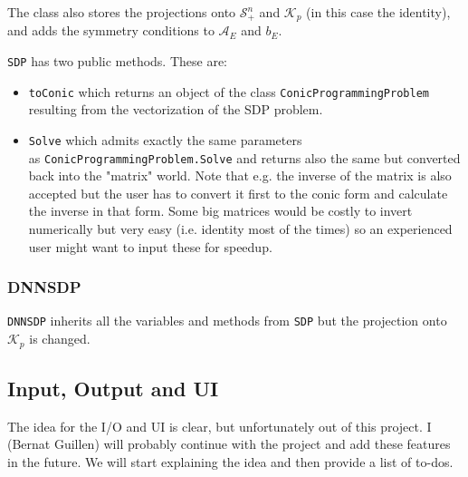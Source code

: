 \documentclass[paper=a4, fontsize=11pt]{scrartcl}
\numberwithin{equation}{section}		%
\numberwithin{figure}{section}			%
\numberwithin{table}{section}				%
\begin{document}
The class also stores the projections onto $\mathcal{S}^n_+$ and $\mathcal{K}_p$ (in this case the identity), and adds the symmetry conditions to $\mathcal{A}_E$ and $b_E$.

\texttt{SDP} has two public methods. These are:
\begin{itemize}
\item \texttt{toConic} which returns an object of the class \texttt{ConicProgrammingProblem} resulting from the vectorization of the SDP problem.
\item \texttt{Solve} which admits exactly the same parameters\\ as \texttt{ConicProgrammingProblem.Solve} and returns also the same but converted back into the "matrix" world. Note that e.g. the inverse of the matrix is also accepted but the user has to convert it first to the conic form and calculate the inverse in that form. Some big matrices would be costly to invert numerically but very easy (i.e. identity most of the times) so an experienced user might want to input these for speedup.
\end{itemize}
\subsubsection{DNNSDP}
\texttt{DNNSDP} inherits all the variables and methods from \texttt{SDP} but the projection onto $\mathcal{K}_p$ is changed.
\subsection{Input, Output and UI}
The idea for the I/O and UI is clear, but unfortunately out of this project. I (Bernat Guillen) will probably continue with the project and add these features in the future. We will start explaining the idea and then provide a list of to-dos.
\end{document}

